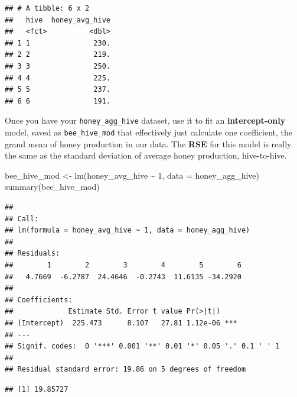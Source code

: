 \documentclass[
  openany]{book}
\newenvironment{Shaded}{\begin{snugshade}}{\end{snugshade}}
\newcommand{\AttributeTok}[1]{\textcolor[rgb]{0.77,0.63,0.00}{#1}}
\newcommand{\CommentTok}[1]{\textcolor[rgb]{0.56,0.35,0.01}{\textit{#1}}}
\newcommand{\DecValTok}[1]{\textcolor[rgb]{0.00,0.00,0.81}{#1}}
\newcommand{\FunctionTok}[1]{\textcolor[rgb]{0.00,0.00,0.00}{#1}}
\newcommand{\NormalTok}[1]{#1}
\newcommand{\OtherTok}[1]{\textcolor[rgb]{0.56,0.35,0.01}{#1}}
\newcommand{\SpecialCharTok}[1]{\textcolor[rgb]{0.00,0.00,0.00}{#1}}
\begin{document}
\begin{verbatim}
## # A tibble: 6 x 2
##   hive  honey_avg_hive
##   <fct>          <dbl>
## 1 1               230.
## 2 2               219.
## 3 3               250.
## 4 4               225.
## 5 5               237.
## 6 6               191.
\end{verbatim}

Once you have your \texttt{honey\_agg\_hive} dataset, use it to fit an \textbf{intercept-only} model, saved as \texttt{bee\_hive\_mod} that effectively just calculate one coefficient, the grand mean of honey production in our data. The \textbf{RSE} for this model is really the same as the standard deviation of average honey production, hive-to-hive.

\begin{Shaded}
\begin{Highlighting}[]
\NormalTok{bee\_hive\_mod }\OtherTok{\textless{}{-}} \FunctionTok{lm}\NormalTok{(honey\_avg\_hive }\SpecialCharTok{\textasciitilde{}} \DecValTok{1}\NormalTok{, }\AttributeTok{data =}\NormalTok{ honey\_agg\_hive)}
\FunctionTok{summary}\NormalTok{(bee\_hive\_mod)}
\end{Highlighting}
\end{Shaded}

\begin{verbatim}
## 
## Call:
## lm(formula = honey_avg_hive ~ 1, data = honey_agg_hive)
## 
## Residuals:
##        1        2        3        4        5        6 
##   4.7669  -6.2787  24.4646  -0.2743  11.6135 -34.2920 
## 
## Coefficients:
##             Estimate Std. Error t value Pr(>|t|)    
## (Intercept)  225.473      8.107   27.81 1.12e-06 ***
## ---
## Signif. codes:  0 '***' 0.001 '**' 0.01 '*' 0.05 '.' 0.1 ' ' 1
## 
## Residual standard error: 19.86 on 5 degrees of freedom
\end{verbatim}

\begin{Shaded}
\end{Shaded}

\begin{verbatim}
## [1] 19.85727
\end{verbatim}
\end{document}
